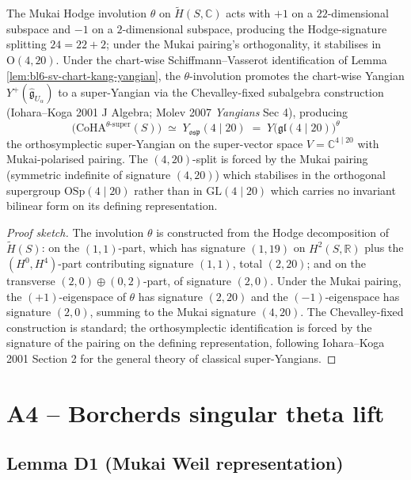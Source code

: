 \begin{lemma}
\label{lem:bl6-mukai-osp-chevalley}
The Mukai Hodge involution $\theta$ on
$\widetilde H(S, \mathbb C)$ acts with $+1$ on a $22$-dimensional
subspace and $-1$ on a $2$-dimensional subspace, producing the
Hodge-signature splitting $24 = 22 + 2$; under the Mukai pairing's
orthogonality, it stabilises in $\mathrm{O}(4, 20)$.  Under the
chart-wise Schiffmann--Vasserot identification of
Lemma \ref{lem:bl6-sv-chart-kang-yangian}, the $\theta$-involution
promotes the chart-wise Yangian $Y^{+}(\widehat{\mathfrak
g}_{U_{\alpha}})$ to a super-Yangian via the Chevalley-fixed
subalgebra construction (Iohara--Koga 2001 J Algebra; Molev 2007
\emph{Yangians} Sec 4), producing
\[
   \bigl(\mathrm{CoHA}^{\theta\text{-super}}(S)\bigr)
     \;\simeq\;
   Y_{\mathfrak{osp}}(4 \mid 20)
     \;=\;
   Y\bigl(\mathfrak{gl}(4 \mid 20)\bigr)^{\theta}
\]
the orthosymplectic super-Yangian on the super-vector space
$V = \mathbb C^{4 \mid 20}$ with Mukai-polarised pairing.  The
$(4, 20)$-split is forced by the Mukai pairing (symmetric indefinite
of signature $(4, 20)$) which stabilises in the orthogonal
supergroup $\mathrm{OSp}(4 \mid 20)$ rather than in
$\mathrm{GL}(4 \mid 20)$ which carries no invariant bilinear form
on its defining representation.
\end{lemma}

\begin{proof}[Proof sketch]
The involution $\theta$ is constructed from the Hodge decomposition
of $\widetilde H(S)$: on the $(1, 1)$-part, which has signature
$(1, 19)$ on $H^{2}(S, \mathbb R)$ plus the $(H^{0}, H^{4})$-part
contributing signature $(1, 1)$, total $(2, 20)$; and on the
transverse $(2, 0) \oplus (0, 2)$-part, of signature $(2, 0)$.
Under the Mukai pairing, the $(+1)$-eigenspace of $\theta$ has
signature $(2, 20)$ and the $(-1)$-eigenspace has signature $(2, 0)$,
summing to the Mukai signature $(4, 20)$.  The Chevalley-fixed
construction is standard; the orthosymplectic identification is
forced by the signature of the pairing on the defining
representation, following Iohara--Koga 2001 Section 2 for the
general theory of classical super-Yangians.
\end{proof}

\section*{A4 -- Borcherds singular theta lift}

\subsection*{Lemma D1 (Mukai Weil representation)}


